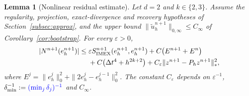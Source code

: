 \documentclass[11pt]{article}
\newtheorem{lemma}{Lemma}
\theoremstyle{remark}\newtheorem{remark}{Remark}
\newcommand{\tu}{\tilde u_h}
\newcommand{\Simex}{S_{\mathrm{IMEX}}}
\newcommand{\Ph}{P_h}
\newcommand{\eps}{\varepsilon}
\theoremstyle{plain}
\newcommand{\new}[1]{{\color{blue}#1}}
\begin{document}
\begin{lemma}[Nonlinear residual estimate]\label{lem:nonlinear-residual}
\new{Let $d=2$ and $k\in\{2,3\}$.} Assume the regularity, projection, exact-divergence and recovery hypotheses of Section~\ref{subsec:approx}, and \new{the upper bound $\|\tu^{n+1}\|_{0,\infty}\le C_\infty$ of Corollary~\ref{cor:bootstrap}}. For every $\eps>0$,
\begin{align}
|N^{n+1}(e_h^{n+1})|
\le{}&\eps\Simex^{n+1}(e_h^{n+1},e_h^{n+1})
+C\big(E^{n+1}+E^n\big)\notag\\
&+C\big(\Delta t^4+h^{2k+2}\big)
+C_\eps\|z^{n+1}-\Ph z^{n+1}\|_*^2,
\label{eq:nonlinear-residual-lemma-bound}
\end{align}
where $E^j=\|e_h^j\|_0^2+\|2e_h^j-e_h^{j-1}\|_0^2$. The constant $C_\eps$ depends on $\eps^{-1}$, $\delta_{\min}^{-1}:=\new{(\min_j\delta_j)^{-1}}$ and $C_\infty$.
\end{lemma}
\end{document}
